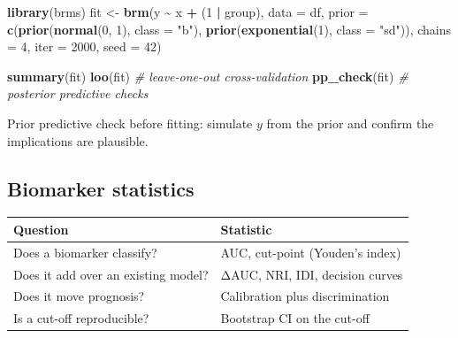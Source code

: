 \documentclass[
]{article}
\newenvironment{Shaded}{\begin{snugshade}}{\end{snugshade}}
\newcommand{\AttributeTok}[1]{\textcolor[rgb]{0.13,0.29,0.53}{#1}}
\newcommand{\CommentTok}[1]{\textcolor[rgb]{0.56,0.35,0.01}{\textit{#1}}}
\newcommand{\DecValTok}[1]{\textcolor[rgb]{0.00,0.00,0.81}{#1}}
\newcommand{\FunctionTok}[1]{\textcolor[rgb]{0.13,0.29,0.53}{\textbf{#1}}}
\newcommand{\NormalTok}[1]{#1}
\newcommand{\OtherTok}[1]{\textcolor[rgb]{0.56,0.35,0.01}{#1}}
\newcommand{\SpecialCharTok}[1]{\textcolor[rgb]{0.81,0.36,0.00}{\textbf{#1}}}
\newcommand{\StringTok}[1]{\textcolor[rgb]{0.31,0.60,0.02}{#1}}
\newcounter{none} %
\begin{document}
\begin{Shaded}
\begin{Highlighting}[]
\FunctionTok{library}\NormalTok{(brms)}
\NormalTok{fit }\OtherTok{\textless{}{-}} \FunctionTok{brm}\NormalTok{(y }\SpecialCharTok{\textasciitilde{}}\NormalTok{ x }\SpecialCharTok{+}\NormalTok{ (}\DecValTok{1} \SpecialCharTok{|}\NormalTok{ group), }\AttributeTok{data =}\NormalTok{ df,}
           \AttributeTok{prior =} \FunctionTok{c}\NormalTok{(}\FunctionTok{prior}\NormalTok{(}\FunctionTok{normal}\NormalTok{(}\DecValTok{0}\NormalTok{, }\DecValTok{1}\NormalTok{), }\AttributeTok{class =} \StringTok{"b"}\NormalTok{),}
                     \FunctionTok{prior}\NormalTok{(}\FunctionTok{exponential}\NormalTok{(}\DecValTok{1}\NormalTok{), }\AttributeTok{class =} \StringTok{"sd"}\NormalTok{)),}
           \AttributeTok{chains =} \DecValTok{4}\NormalTok{, }\AttributeTok{iter =} \DecValTok{2000}\NormalTok{, }\AttributeTok{seed =} \DecValTok{42}\NormalTok{)}

\FunctionTok{summary}\NormalTok{(fit)}
\FunctionTok{loo}\NormalTok{(fit)               }\CommentTok{\# leave{-}one{-}out cross{-}validation}
\FunctionTok{pp\_check}\NormalTok{(fit)           }\CommentTok{\# posterior predictive checks}
\end{Highlighting}
\end{Shaded}

Prior predictive check before fitting: simulate \(y\) from the prior and
confirm the implications are plausible.

\subsection{Biomarker statistics}\label{biomarker-statistics}

{\def\LTcaptype{none} %
\begin{longtable}[]{@{}
  >{\raggedright\arraybackslash}p{}
  >{\raggedright\arraybackslash}p{}@{}}
\toprule\noalign{}
\begin{minipage}[b]{\linewidth}\raggedright
Question
\end{minipage} & \begin{minipage}[b]{\linewidth}\raggedright
Statistic
\end{minipage} \\
\midrule\noalign{}
\endhead
\bottomrule\noalign{}
\endlastfoot
Does a biomarker classify? & AUC, cut-point (Youden's index) \\
Does it add over an existing model? & ΔAUC, NRI, IDI, decision curves \\
Does it move prognosis? & Calibration plus discrimination \\
Is a cut-off reproducible? & Bootstrap CI on the cut-off \\
\end{longtable}
}
\end{document}
